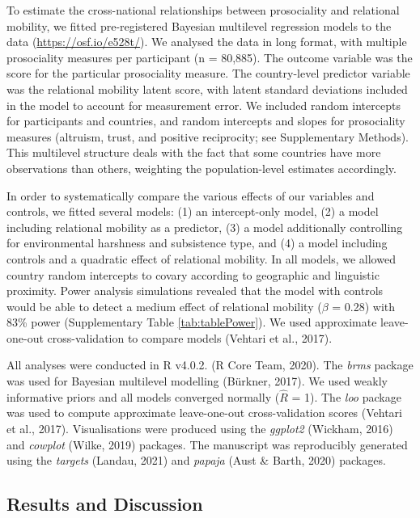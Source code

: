 \documentclass[
  man,floatsintext]{apa6}
\begin{document}
To estimate the cross-national relationships between prosociality and relational mobility, we fitted pre-registered Bayesian multilevel regression models to the data (\url{https://osf.io/e528t/}). We analysed the data in long format, with multiple prosociality measures per participant (n = 80,885). The outcome variable was the score for the particular prosociality measure. The country-level predictor variable was the relational mobility latent score, with latent standard deviations included in the model to account for measurement error. We included random intercepts for participants and countries, and random intercepts and slopes for prosociality measures (altruism, trust, and positive reciprocity; see Supplementary Methods). This multilevel structure deals with the fact that some countries have more observations than others, weighting the population-level estimates accordingly.

In order to systematically compare the various effects of our variables and controls, we fitted several models: (1) an intercept-only model, (2) a model including relational mobility as a predictor, (3) a model additionally controlling for environmental harshness and subsistence type, and (4) a model including controls and a quadratic effect of relational mobility. In all models, we allowed country random intercepts to covary according to geographic and linguistic proximity. Power analysis simulations revealed that the model with controls would be able to detect a medium effect of relational mobility (\(\beta\) = 0.28) with 83\% power (Supplementary Table \ref{tab:tablePower}). We used approximate leave-one-out cross-validation to compare models (Vehtari et al., 2017).

All analyses were conducted in R v4.0.2. (R Core Team, 2020). The \emph{brms} package was used for Bayesian multilevel modelling (Bürkner, 2017). We used weakly informative priors and all models converged normally (\(\hat{R}\) = 1). The \emph{loo} package was used to compute approximate leave-one-out cross-validation scores (Vehtari et al., 2017). Visualisations were produced using the \emph{ggplot2} (Wickham, 2016) and \emph{cowplot} (Wilke, 2019) packages. The manuscript was reproducibly generated using the \emph{targets} (Landau, 2021) and \emph{papaja} (Aust \& Barth, 2020) packages.

\hypertarget{results-and-discussion}{%
\subsection{Results and Discussion}\label{results-and-discussion}}
\end{document}
